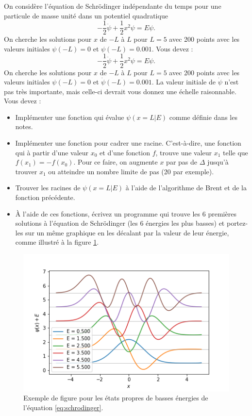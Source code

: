 \documentclass{article}
\begin{document}
On considère l’équation de Schrödinger indépendante du temps pour une particule de masse unité dans
un potentiel quadratique
\begin{equation}
    - \frac{1}{2} \ddot{\psi} + \frac{1}{2} x^2 \psi = E \psi.
    \label{eq:schrodinger}
\end{equation}
On cherche les solutions pour $x$ de $-L$ à $L$ pour $L = 5$ avec 200 points 
avec les valeurs initiales $\psi(-L) = 0$
et $\psi(-L) = 0.001$. Vous devez :\begin{equation}
    - \frac{1}{2} \ddot{\psi} + \frac{1}{2} x^2 \psi = E \psi.
    \label{eq:schrodinger}
\end{equation}
On cherche les solutions pour $x$ de $-L$ à $L$ pour $L = 5$ avec 200 points 
avec les valeurs initiales $\psi(-L) = 0$ et $\dot \psi(-L) = 0.001$.
La valeur initiale de $\dot \psi$ n'est pas très importante, 
mais celle-ci devrait vous donnez une échelle raisonnable. Vous devez :
\begin{itemize}
    \item 
    Implémenter une fonction qui évalue $\psi(x = L|E)$ comme définie dans les notes.
   
    \item 
    Implémenter une fonction pour cadrer une racine. 
    C’est-à-dire, une fonction qui à partir d’une valeur $x_0$ et d’une fonction $f$,
    trouve une valeur $x_1$ telle que $f(x_1) = -f(x_0)$.
    Pour ce faire, on augmente $x$ par pas de $\Delta$ jusqu’à trouver 
    $x_1$ ou atteindre un nombre limite de pas (20 par exemple).
   
    \item 
    Trouver les racines de $\psi(x = L|E)$ à l’aide de l’algorithme de Brent et de la fonction précédente.

    \item 
    À l’aide de ces fonctions, écrivez un programme qui trouve les 6 premières solutions à l’équation de
    Schrödinger (les 6 énergies les plus basses) et portez-les sur un même graphique en les décalant par la
    valeur de leur énergie, comme illustré à la figure \ref{fig:exemple}.
\end{itemize}

\begin{figure}
    \centering
    \includegraphics[scale=0.5]{exemple.png}
    \caption{Exemple de figure pour les états propres de basses énergies 
    de l'équation \ref{eq:schrodinger}.}
    \label{fig:exemple}
\end{figure}
\end{document}
